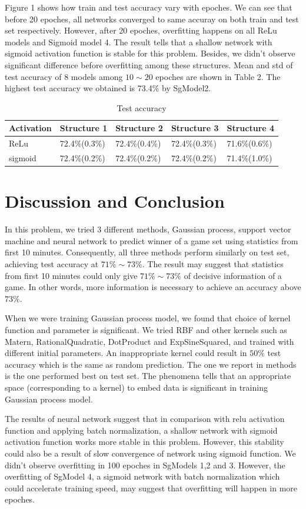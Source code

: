 \documentclass{article}
\begin{document}
Figure 1 shows how train and test accuracy vary with epoches. We can see that before 20 epoches, all networks converged to same accuray on both train and test set respectively. However, after 20 epoches, overfitting happens on all ReLu models and Sigmoid model 4. The result tells that a shallow network with sigmoid activation function is stable for this problem. Besides, we didn't observe significant difference before overfitting among these structures. Mean and std of test accuracy of 8 models among $10\sim 20$ epoches are shown in Table 2. The highest test accuracy we obtained is 73.4\% by SgModel2.

\begin{table}[h!]
\caption{Test accuracy}
\centering
\begin{tabular}{ |p{2cm}||p{2cm}|p{2cm}|p{2cm}|p{2cm}|  }
\hline
Activation & Structure 1& Structure 2 &Structure 3 & Structure 4 \\
\hline
ReLu & 72.4\%(0.3\%) & 72.4\%(0.4\%) & 72.4\%(0.3\%) & 71.6\%(0.6\%) \\
\hline 
sigmoid & 72.4\%(0.2\%) & 72.4\%(0.2\%) & 72.4\%(0.2\%) & 71.4\%(1.0\%) \\
\hline
\end{tabular}
\end{table}

\section{Discussion and Conclusion}

In this problem, we tried 3 different methods, Gaussian process, support vector machine and neural network to predict winner of a game set using statistics from first 10 minutes. Consequently, all three methods perform similarly on test set, achieving test accuracy at $71\%\sim73\%$. The result may suggest that statistics from first 10 minutes could only give $71\%\sim73\%$ of decisive information of a game. In other words, more information is necessary to achieve an accuracy above $73\%$.

When we were training Gaussian process model, we found that choice of kernel function and parameter is significant. We tried RBF and other kernels such as Matern, RationalQuadratic, DotProduct and ExpSineSquared, and trained with different initial parameters. An inappropriate kernel could result in $50\%$ test accuracy which is the same as random prediction. The one we report in methods is the one performed best on test set. The phenomena tells that an appropriate space (corresponding to a kernel) to embed data is significant in training Gaussian process model.

The results of neural network suggest that in comparison with relu activation function and applying batch normalization, a shallow network with sigmoid activation function works more stable in this problem. However, this stability could also be a result of slow convergence of network using sigmoid function. We didn't observe overfitting in 100 epoches in SgModels 1,2 and 3. However, the overfitting of SgModel 4, a sigmoid network with batch normalization which could accelerate training speed, may suggest that overfitting will happen in more epoches.




\end{document}
